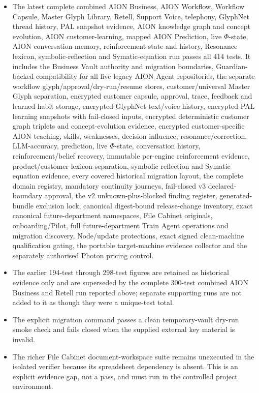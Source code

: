 \documentclass[11pt]{article}
\begin{document}
\begin{itemize}
  \item The latest complete combined AION Business, AION Workflow, Workflow Capsule, Master Glyph Library, Retell, Support Voice, telephony, GlyphNet thread history, PAL snapshot evidence, AION knowledge graph and concept evolution, AION customer-learning, mapped AION Prediction, live $\Phi$-state, AION conversation-memory, reinforcement state and history, Resonance lexicon, symbolic-reflection and Symatic-equation run passes all 414 tests. It includes the Business Vault authority and migration boundaries, Guardian-backed compatibility for all five legacy AION Agent repositories, the separate workflow glyph/approval/dry-run/resume stores, customer/universal Master Glyph separation, encrypted customer capsule, approval, trace, feedback and learned-habit storage, encrypted GlyphNet text/voice history, encrypted PAL learning snapshots with fail-closed inputs, encrypted deterministic customer graph triplets and concept-evolution evidence, encrypted customer-specific AION teaching, skills, weaknesses, decision influence, resonance/correction, LLM-accuracy, prediction, live $\Phi$-state, conversation history, reinforcement/belief recovery, immutable per-engine reinforcement evidence, product/customer lexicon separation, symbolic reflection and Symatic equation evidence, every covered historical migration layout, the complete domain registry, mandatory continuity journeys, fail-closed v3 declared-boundary approval, the v2 unknown-plus-blocked finding register, generated-bundle exclusion lock, canonical digest-bound release-change inventory, exact canonical future-department namespaces, File Cabinet originals, onboarding/Pilot, full future-department Train Agent operations and migration discovery, Node/update protections, exact signed clean-machine qualification gating, the portable target-machine evidence collector and the separately authorised Photon pricing control.
  \item The earlier 194-test through 298-test figures are retained as historical evidence only and are superseded by the complete 300-test combined AION Business and Retell run reported above; separate supporting runs are not added to it as though they were a unique-test total.
  \item The explicit migration command passes a clean temporary-vault dry-run smoke check and fails closed when the supplied external key material is invalid.
  \item The richer File Cabinet document-workspace suite remains unexecuted in the isolated verifier because its spreadsheet dependency is absent. This is an explicit evidence gap, not a pass, and must run in the controlled project environment.
\end{itemize}
\end{document}
